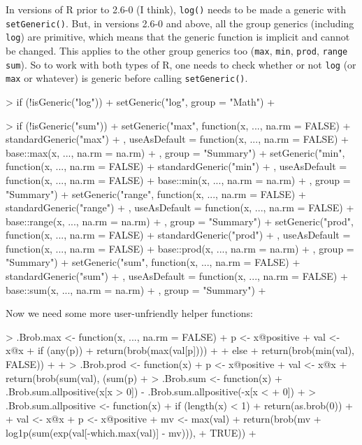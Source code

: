 \documentclass[a4paper]{article}
\begin{document}
In versions of R prior to 2.6-0 (I think), {\tt log()} needs to be
made a generic with {\tt setGeneric()}.  But, in versions 2.6-0 and
above, all the group generics (including {\tt log}) are primitive,
which means that the generic function is implicit and cannot be
changed.  This applies to the other group generics too ({\tt max},
{\tt min}, {\tt prod}, {\tt range} {\tt sum}).  So to work with both
types of R, one needs to check whether or not {\tt log} (or {\tt max}
or whatever) is generic before calling {\tt setGeneric()}.

\begin{Schunk}
\begin{Sinput}
> if (!isGeneric("log")) {
+     setGeneric("log", group = "Math")
+ }
\end{Sinput}
\end{Schunk}


\begin{Schunk}
\begin{Sinput}
> if (!isGeneric("sum")) {
+     setGeneric("max", function(x, ..., na.rm = FALSE) {
+         standardGeneric("max")
+     }, useAsDefault = function(x, ..., na.rm = FALSE) {
+         base::max(x, ..., na.rm = na.rm)
+     }, group = "Summary")
+     setGeneric("min", function(x, ..., na.rm = FALSE) {
+         standardGeneric("min")
+     }, useAsDefault = function(x, ..., na.rm = FALSE) {
+         base::min(x, ..., na.rm = na.rm)
+     }, group = "Summary")
+     setGeneric("range", function(x, ..., na.rm = FALSE) {
+         standardGeneric("range")
+     }, useAsDefault = function(x, ..., na.rm = FALSE) {
+         base::range(x, ..., na.rm = na.rm)
+     }, group = "Summary")
+     setGeneric("prod", function(x, ..., na.rm = FALSE) {
+         standardGeneric("prod")
+     }, useAsDefault = function(x, ..., na.rm = FALSE) {
+         base::prod(x, ..., na.rm = na.rm)
+     }, group = "Summary")
+     setGeneric("sum", function(x, ..., na.rm = FALSE) {
+         standardGeneric("sum")
+     }, useAsDefault = function(x, ..., na.rm = FALSE) {
+         base::sum(x, ..., na.rm = na.rm)
+     }, group = "Summary")
+ }
\end{Sinput}
\end{Schunk}

Now we need some more user-unfriendly helper functions:

\begin{Schunk}
\begin{Sinput}
> .Brob.max <- function(x, ..., na.rm = FALSE) {
+     p <- x@positive
+     val <- x@x
+     if (any(p)) {
+         return(brob(max(val[p])))
+     }
+     else {
+         return(brob(min(val), FALSE))
+     }
+ }
> .Brob.prod <- function(x) {
+     p <- x@positive
+     val <- x@x
+     return(brob(sum(val), (sum(p)%%2) == 0))
+ }
> .Brob.sum <- function(x) {
+     .Brob.sum.allpositive(x[x > 0]) - .Brob.sum.allpositive(-x[x < 
+         0])
+ }
> .Brob.sum.allpositive <- function(x) {
+     if (length(x) < 1) {
+         return(as.brob(0))
+     }
+     val <- x@x
+     p <- x@positive
+     mv <- max(val)
+     return(brob(mv + log1p(sum(exp(val[-which.max(val)] - mv))), 
+         TRUE))
+ }
\end{Sinput}
\end{Schunk}
\end{document}
